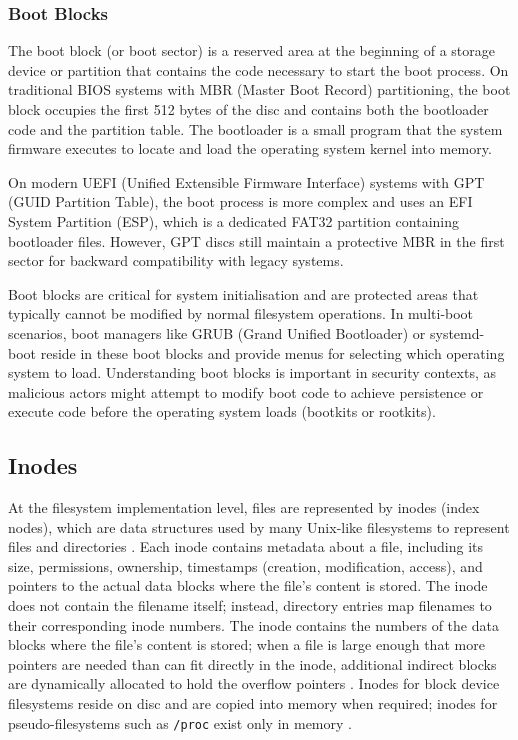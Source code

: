 \subsubsection{Boot Blocks}
\label{BootBlocks}

The boot block (or boot sector) is a reserved area at the beginning of a storage device or partition that contains the code necessary to start the boot process. On traditional BIOS systems with MBR (Master Boot Record) partitioning, the boot block occupies the first 512 bytes of the disc and contains both the bootloader code and the partition table. The bootloader is a small program that the system firmware executes to locate and load the operating system kernel into memory.

On modern UEFI (Unified Extensible Firmware Interface) systems with GPT (GUID Partition Table), the boot process is more complex and uses an EFI System Partition (ESP), which is a dedicated FAT32 partition containing bootloader files. However, GPT discs still maintain a protective MBR in the first sector for backward compatibility with legacy systems.

Boot blocks are critical for system initialisation and are protected areas that typically cannot be modified by normal filesystem operations. In multi-boot scenarios, boot managers like GRUB (Grand Unified Bootloader) or systemd-boot reside in these boot blocks and provide menus for selecting which operating system to load. Understanding boot blocks is important in security contexts, as malicious actors might attempt to modify boot code to achieve persistence or execute code before the operating system loads (bootkits or rootkits).

\subsection{Inodes}
\label{Inodes}

At the filesystem implementation level, files are represented by inodes (index nodes), which are data structures used by many Unix-like filesystems to represent files and directories \parencite{KernelVFS}. Each inode contains metadata about a file, including its size, permissions, ownership, timestamps (creation, modification, access), and pointers to the actual data blocks where the file's content is stored. The inode does not contain the filename itself; instead, directory entries map filenames to their corresponding inode numbers. The inode contains the numbers of the data blocks where the file's content is stored; when a file is large enough that more pointers are needed than can fit directly in the inode, additional indirect blocks are dynamically allocated to hold the overflow pointers \parencite{LinuxSAGFilesystems}. Inodes for block device filesystems reside on disc and are copied into memory when required; inodes for pseudo-filesystems such as \texttt{/proc} exist only in memory \parencite{KernelVFS,KernelProc}.

